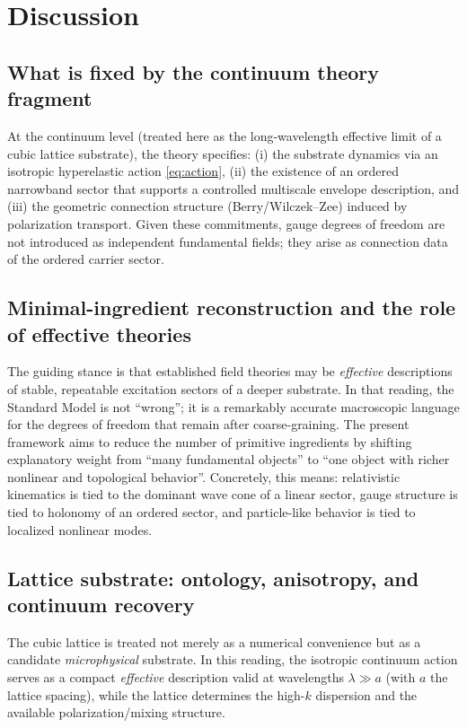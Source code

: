 \section{Discussion}
\label{sec:discussion}

\subsection{What is fixed by the continuum theory fragment}

At the continuum level (treated here as the long-wavelength effective limit of a cubic lattice substrate), the theory specifies:
(i) the substrate dynamics via an isotropic hyperelastic action \eqref{eq:action},
(ii) the existence of an ordered narrowband sector that supports a controlled multiscale envelope description,
and (iii) the geometric connection structure (Berry/Wilczek--Zee) induced by polarization transport.
Given these commitments, gauge degrees of freedom are not introduced as independent fundamental fields; they arise as
connection data of the ordered carrier sector.

\subsection{Minimal-ingredient reconstruction and the role of effective theories}

The guiding stance is that established field theories may be \emph{effective} descriptions of stable, repeatable
excitation sectors of a deeper substrate.
In that reading, the Standard Model is not ``wrong''; it is a remarkably accurate macroscopic language for the
degrees of freedom that remain after coarse-graining.
The present framework aims to reduce the number of primitive ingredients by shifting explanatory weight from
``many fundamental objects'' to ``one object with richer nonlinear and topological behavior''.
Concretely, this means:
relativistic kinematics is tied to the dominant wave cone of a linear sector,
gauge structure is tied to holonomy of an ordered sector,
and particle-like behavior is tied to localized nonlinear modes.

\subsection{Lattice substrate: ontology, anisotropy, and continuum recovery}
\label{subsec:discussion-lattice}

The cubic lattice is treated not merely as a numerical convenience but as a candidate \emph{microphysical}
substrate.
In this reading, the isotropic continuum action serves as a compact \emph{effective} description valid at wavelengths
$\lambda\gg a$ (with $a$ the lattice spacing), while the lattice determines the high-$k$ dispersion and the available
polarization/mixing structure.

